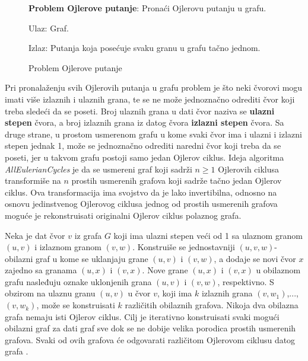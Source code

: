 \documentclass[12pt,oneside]{memoir}
\begin{document}
\begin{figure}[!ht]
\begin{tcolorbox}
\textbf{Problem Ojlerove putanje}: Pronaći Ojlerovu putanju u grafu.

Ulaz: Graf.

Izlaz: Putanja koja posećuje svaku granu u grafu tačno jednom.
\end{tcolorbox}
\caption{Problem Ojlerove putanje}
\label{box:Ojler}
\end{figure}


Pri pronalaženju svih Ojlerovih putanja u grafu problem je što neki čvorovi mogu imati više izlaznih i ulaznih grana, te se ne može jednoznačno odrediti čvor koji treba sledeći da se poseti. Broj ulaznih grana u dati čvor naziva se \textbf{ulazni stepen} čvora, a broj izlaznih grana iz datog čvora \textbf{izlazni stepen} čvora. Sa druge strane, u prostom usmerenom grafu u kome svaki čvor ima i ulazni i izlazni stepen jednak 1, može se jednoznačno odrediti naredni čvor koji treba da se poseti, jer u takvom grafu postoji samo jedan Ojlerov ciklus. Ideja algoritma \textit{AllEulerianCycles} je da se usmereni graf koji sadrži $n \geq 1$ Ojlerovih ciklusa transformiše na $n$ prostih usmerenih grafova koji sadrže tačno jedan Ojlerov ciklus. Ova transformacija ima svojstvo da je lako invertibilna, odnosno na osnovu jedinstvenog Ojlerovog ciklusa jednog od prostih usmerenih grafova moguće je rekonstruisati originalni Ojlerov ciklus polaznog grafa.

Neka je dat čvor $v$ iz grafa $G$ koji ima ulazni stepen veći od 1 sa ulaznom granom $(u, v)$ i izlaznom granom $(v, w)$. Konstruiše se jednostavniji $(u, v, w)$-obilazni graf u kome se uklanjaju grane $(u, v)$ i $(v, w)$, a dodaje se novi čvor $x$ zajedno sa granama $(u, x)$ i $(v, x)$. Nove grane $(u, x)$ i $(v, x)$ u obilaznom grafu nasleđuju oznake uklonjenih grana $(u, v)$ i $(v, w)$, respektivno. S obzirom na ulaznu granu $(u, v)$ u čvor $v$, koji ima $k$ izlaznih grana $(v, w_1)$,..., $(v, w_k)$, može se konstruisati $k$ različitih obilaznih grafova. Nikoja dva obilazna grafa nemaju isti Ojlerov ciklus. Cilj je iterativno konstruisati svaki mogući obilazni graf za dati graf sve dok se ne dobije velika porodica prostih usmerenih grafova. Svaki od ovih grafova će odgovarati različitom Ojlerovom ciklusu datog grafa \cite{bioinformaticsAlg}.
\end{document}
